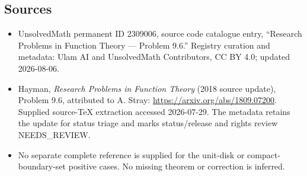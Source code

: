 \documentclass[11pt]{article}
\begin{document}
\subsection{Sources}
\begin{itemize}
\item UnsolvedMath permanent ID 2309006, source code catalogue entry, ``Research Problems in Function Theory --- Problem 9.6.'' Registry curation and metadata: Ulam AI and UnsolvedMath Contributors, CC BY 4.0; updated 2026-08-06.
\item Hayman, \emph{Research Problems in Function Theory} (2018 source update), Problem 9.6, attributed to A. Stray: \url{https://arxiv.org/abs/1809.07200}. Supplied source-TeX extraction accessed 2026-07-29. The metadata retains the update for status triage and marks status/release and rights review NEEDS\_REVIEW.
\item No separate complete reference is supplied for the unit-disk or compact-boundary-set positive cases. No missing theorem or correction is inferred.
\end{itemize}
\end{document}
